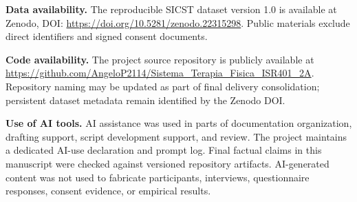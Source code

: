 \documentclass[pdflatex,sn-basic]{sn-jnl}
\begin{document}
\textbf{Data availability.} The reproducible SICST dataset version 1.0 is available at Zenodo, DOI: \url{https://doi.org/10.5281/zenodo.22315298}. Public materials exclude direct identifiers and signed consent documents.

\textbf{Code availability.} The project source repository is publicly available at \url{https://github.com/AngeloP2114/Sistema_Terapia_Fisica_ISR401_2A}. Repository naming may be updated as part of final delivery consolidation; persistent dataset metadata remain identified by the Zenodo DOI.

\textbf{Use of AI tools.} AI assistance was used in parts of documentation organization, drafting support, script development support, and review. The project maintains a dedicated AI-use declaration and prompt log. Final factual claims in this manuscript were checked against versioned repository artifacts. AI-generated content was not used to fabricate participants, interviews, questionnaire responses, consent evidence, or empirical results.



\end{document}

